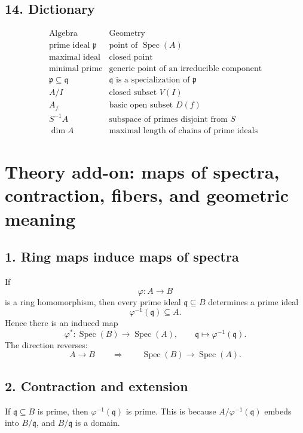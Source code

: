 \documentclass[12pt,a4paper]{article}
\theoremstyle{plain}
\theoremstyle{definition}      %
\begin{document}
\subsection*{14. Dictionary}

\[
\begin{array}{c|c}
	\text{Algebra} & \text{Geometry} \\
	\hline
	\text{prime ideal } \mathfrak p & \text{point of } \operatorname{Spec}(A) \\
	\text{maximal ideal} & \text{closed point} \\
	\text{minimal prime} & \text{generic point of an irreducible component} \\
	\mathfrak p\subseteq \mathfrak q & \mathfrak q \text{ is a specialization of } \mathfrak p \\
	A/I & \text{closed subset } V(I) \\
	A_f & \text{basic open subset } D(f) \\
	S^{-1}A & \text{subspace of primes disjoint from }S \\
	\dim A & \text{maximal length of chains of prime ideals}
\end{array}
\]

\section*{Theory add-on: maps of spectra, contraction, fibers, and geometric meaning}

\subsection*{1. Ring maps induce maps of spectra}

If
\[
\varphi:A\to B
\]
is a ring homomorphism, then every prime ideal \(\mathfrak q\subseteq B\) determines a prime ideal
\[
\varphi^{-1}(\mathfrak q)\subseteq A.
\]
Hence there is an induced map
\[
\varphi^*:\operatorname{Spec}(B)\to \operatorname{Spec}(A),
\qquad
\mathfrak q\mapsto \varphi^{-1}(\mathfrak q).
\]
The direction reverses:
\[
A\to B
\qquad\Longrightarrow\qquad
\operatorname{Spec}(B)\to \operatorname{Spec}(A).
\]

\subsection*{2. Contraction and extension}

If \(\mathfrak q\subseteq B\) is prime, then \(\varphi^{-1}(\mathfrak q)\) is prime. This is because \(A/\varphi^{-1}(\mathfrak q)\) embeds into \(B/\mathfrak q\), and \(B/\mathfrak q\) is a domain.
\end{document}
